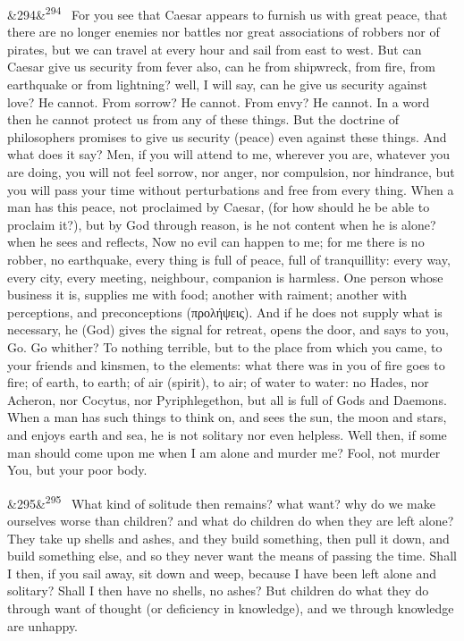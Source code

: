 \documentclass[12pt]{article}
\newcommand{\para}[1][]{\par\noindent\ifx&#1&\else\textsuperscript{\footnotesize #1}~\fi}
\begin{document}
\para[294] For you see that Caesar appears to furnish us with great peace, that there are no longer enemies nor battles nor great associations of robbers nor of pirates, but we can travel at every hour and sail from east to west. But can Caesar give us security from fever also, can he from shipwreck, from fire, from earthquake or from lightning? well, I will say, can he give us security against love? He cannot. From sorrow? He cannot. From envy? He cannot. In a word then he cannot protect us from any of these things. But the doctrine of philosophers promises to give us security (peace) even against these things. And what does it say? Men, if you will attend to me, wherever you are, whatever you are doing, you will not feel sorrow, nor anger, nor compulsion, nor hindrance, but you will pass your time without perturbations and free from every thing. When a man has this peace, not proclaimed by Caesar, (for how should he be able to proclaim it?), but by God through reason, is he not content when he is alone? when he sees and reflects, Now no evil can happen to me; for me there is no robber, no earthquake, every thing is full of peace, full of tranquillity: every way, every city, every meeting, neighbour, companion is harmless. One person whose business it is, supplies me with food; another with raiment; another with perceptions, and preconceptions (προλήψεις). And if he does not supply what is necessary, he (God) gives the signal for retreat, opens the door, and says to you, Go. Go whither? To nothing terrible, but to the place from which you came, to your friends and kinsmen, to the elements: what there was in you of fire goes to fire; of earth, to earth; of air (spirit), to air; of water to water: no Hades, nor Acheron, nor Cocytus, nor Pyriphlegethon, but all is full of Gods and Daemons. When a man has such things to think on, and sees the sun, the moon and stars, and enjoys earth and sea, he is not solitary nor even helpless. Well then, if some man should come upon me when I am alone and murder me? Fool, not murder You, but your poor body.

\para[295] What kind of solitude then remains? what want? why do we make ourselves worse than children? and what do children do when they are left alone? They take up shells and ashes, and they build something, then pull it down, and build something else, and so they never want the means of passing the time. Shall I then, if you sail away, sit down and weep, because I have been left alone and solitary? Shall I then have no shells, no ashes? But children do what they do through want of thought (or deficiency in knowledge), and we through knowledge are unhappy.
\end{document}
